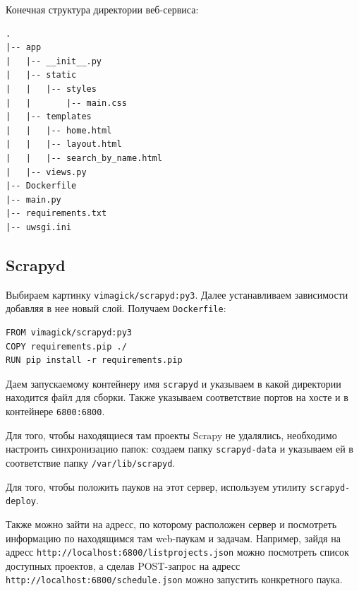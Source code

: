 Конечная структура директории веб-сервиса:
\begin{verbatim}
.
|-- app
|   |-- __init__.py
|   |-- static
|   |   |-- styles
|   |       |-- main.css
|   |-- templates
|   |   |-- home.html
|   |   |-- layout.html
|   |   |-- search_by_name.html
|   |-- views.py
|-- Dockerfile
|-- main.py
|-- requirements.txt
|-- uwsgi.ini
\end{verbatim}


\subsection{Scrapyd}
Выбираем картинку \verb|vimagick/scrapyd:py3|. Далее устанавливаем зависимости
добавляя в нее новый слой. Получаем \verb|Dockerfile|:
\begin{verbatim}
FROM vimagick/scrapyd:py3
COPY requirements.pip ./
RUN pip install -r requirements.pip
\end{verbatim}

Даем запускаемому контейнеру имя \verb|scrapyd| и указываем в какой директории
находится файл для сборки. Также указываем соответствие портов на хосте и в
контейнере \verb|6800:6800|.

Для того, чтобы находящиеся там проекты Scrapy не удалялись, необходимо
настроить синхронизацию папок: создаем папку \verb|scrapyd-data| и указываем ей
в соответствие папку \verb|/var/lib/scrapyd|.

Для того, чтобы положить пауков на этот сервер, используем утилиту
\verb|scrapyd-deploy|.

Также можно зайти на адресс, по которому расположен сервер и посмотреть
информацию по находящимся там web-паукам и задачам. Например, зайдя на адресс
\verb|http://localhost:6800/listprojects.json| можно посмотреть список доступных
проектов, а сделав POST-запрос на адресс
\verb|http://localhost:6800/schedule.json| можно запустить конкретного паука.

